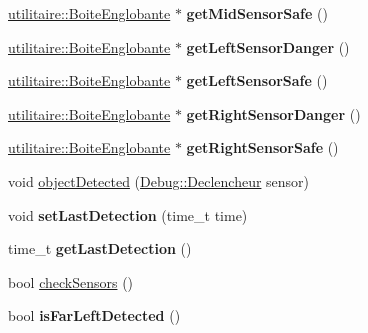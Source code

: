 \begin{DoxyCompactItemize}
\item 
\hypertarget{class_noeud_robot_a978b3bc15dc8d998798464cf5e57fbdc}{\hyperlink{structutilitaire_1_1_boite_englobante}{utilitaire\-::\-Boite\-Englobante} $\ast$ {\bfseries get\-Mid\-Sensor\-Safe} ()}\label{class_noeud_robot_a978b3bc15dc8d998798464cf5e57fbdc}

\item 
\hypertarget{class_noeud_robot_a6c57765cd79030d5dd242b3c5e43cf4a}{\hyperlink{structutilitaire_1_1_boite_englobante}{utilitaire\-::\-Boite\-Englobante} $\ast$ {\bfseries get\-Left\-Sensor\-Danger} ()}\label{class_noeud_robot_a6c57765cd79030d5dd242b3c5e43cf4a}

\item 
\hypertarget{class_noeud_robot_a8c718495a26a6f59af8059e2c9e1917d}{\hyperlink{structutilitaire_1_1_boite_englobante}{utilitaire\-::\-Boite\-Englobante} $\ast$ {\bfseries get\-Left\-Sensor\-Safe} ()}\label{class_noeud_robot_a8c718495a26a6f59af8059e2c9e1917d}

\item 
\hypertarget{class_noeud_robot_afe1bddcea51dc6fe6b989bd5bb15e38e}{\hyperlink{structutilitaire_1_1_boite_englobante}{utilitaire\-::\-Boite\-Englobante} $\ast$ {\bfseries get\-Right\-Sensor\-Danger} ()}\label{class_noeud_robot_afe1bddcea51dc6fe6b989bd5bb15e38e}

\item 
\hypertarget{class_noeud_robot_ade14319e8e15999466142777a875aaca}{\hyperlink{structutilitaire_1_1_boite_englobante}{utilitaire\-::\-Boite\-Englobante} $\ast$ {\bfseries get\-Right\-Sensor\-Safe} ()}\label{class_noeud_robot_ade14319e8e15999466142777a875aaca}

\item 
void \hyperlink{group__inf2990_ga3fdf900e74c2634f92abcb164f6ac96a}{object\-Detected} (\hyperlink{class_debug_afd6ed3c50c08d0a7830cd5253b4ab8b6}{Debug\-::\-Declencheur} sensor)
\item 
\hypertarget{class_noeud_robot_a06e111f1ae3b114e5c552c0b21976a4d}{void {\bfseries set\-Last\-Detection} (time\-\_\-t time)}\label{class_noeud_robot_a06e111f1ae3b114e5c552c0b21976a4d}

\item 
\hypertarget{class_noeud_robot_a076816713bf0a5f55a8a53582972d4f1}{time\-\_\-t {\bfseries get\-Last\-Detection} ()}\label{class_noeud_robot_a076816713bf0a5f55a8a53582972d4f1}

\item 
bool \hyperlink{group__inf2990_ga44545d3ce953677f2380423041e2fdc6}{check\-Sensors} ()
\item 
\hypertarget{class_noeud_robot_a6a16426cea4aa7b9aea6b54ff7815a17}{bool {\bfseries is\-Far\-Left\-Detected} ()}\label{class_noeud_robot_a6a16426cea4aa7b9aea6b54ff7815a17}


\end{DoxyCompactItemize}
